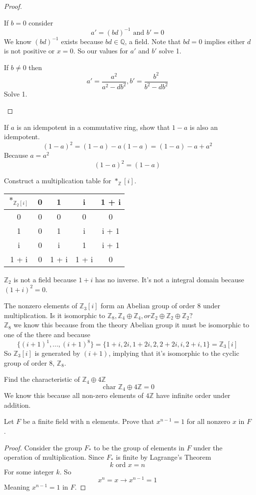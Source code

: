\documentclass[11pt]{article}
\newcommand{\Q}{\mathbb{Q}}
\newcommand{\Z}{\mathbb{Z}}
\begin{document}
\begin{description}
\begin{proof}
	\begin{description}
	\item{If $b = 0$} consider
		$$ a' =  (bd)^{-1} \text{ and } b' = 0 $$
	We know $ (bd)^{-1} $ exists because $ bd \in \Q $, a field.  Note that
			$ bd = 0 $ implies either $ d $ is not positive or  $x =
			0$. So our values for $a'$ and $b'$ solve 1.
	\item{If $b \neq 0$} then 
		$$ a' = \frac{a^2}{a^2 - db^2}, b' = \frac{b^2}{b^2 -
		db^2}$$
		Solve 1.
	\end{description}
	
\end{proof}


\item[41] If $a$ is an idempotent in a commutative ring, show that $1 -  a$ is also
an idempotent.
$$(1-a)^2 = (1-a) - a(1-a) = (1-a) - a + a^2$$
Because $a = a^2$
$$(1-a)^2 = (1-a)$$

\item[42] Construct a multiplication table for $*_\Z[i]$.
	\begin{center}
	\begin{tabular}{ c|c c c c  } 
		$*_{\Z_2[i]}$ & 0  & 1 & i & 1 + i   \\ 
	 \hline
	 0 	& 0 	& 0 & 0 & 0 \\ 
	 1 	& 0 	& 1 & i & i + 1 \\ 
	 i 	& 0 	& i & 1 & i + 1 \\ 
	 1 + i & 0 	& 1 + i & 1 + i  & 0 \\ 
	\end{tabular}
	\end{center}
	$ \Z_2 $ is not a field because $ 1 + i $ has no inverse. It's not a
		integral domain because $ (1+i)^2 = 0 $.

\item[43] The nonzero elements of $\Z_3[i]$ form an Abelian group of
	order 8 under multiplication. Is it isomorphic to $\Z_8, \Z_4
	\oplus  \Z_4 , or \Z_2 \oplus \Z_2 \oplus  \Z_2?$\\
	$ \Z_8 $ we know this because from the theory Abelian group it
	must be isomorphic to one of the there and because
	$$ \{(i+1)^1, ..., (i+1)^8\} = \{1 + i, 2i, 1 + 2i, 2, 2 +
	2i, i, 2 + i, 1\} = \Z_3[i] $$
	So $\Z_3[i]$ is generated by $(i+1)$, implying that it's
	isomorphic to the cyclic group of order 8, $\Z_8$.
	
\item[58] Find the characteristic of $\Z_4 \oplus 4\Z$
	$$\text{ char } \Z_4 \oplus 4\Z = 0$$
	We know this because all non-zero elements of $4\Z$ have infinite order
	under addition.
\item[62] Let $F$ be a finite field with n elements. Prove that $x^{ n - 1 } = 1$ for all
	nonzero $x$ in $F$.
 	\begin{proof}
		Consider the group $F_*$ to be the group of elements in $F$
		under the operation of multiplication. 
		Since $F_*$ is finite by Lagrange's Theorem 
		$$ k  \text{ ord } x = n$$
		For some integer $k$. So
		$$ x^n = x \rightarrow  x^{n-1} = 1 $$
		Meaning $ x^{n-1} = 1 $ in $F$.
 	\end{proof}


\end{description}
\end{document}
